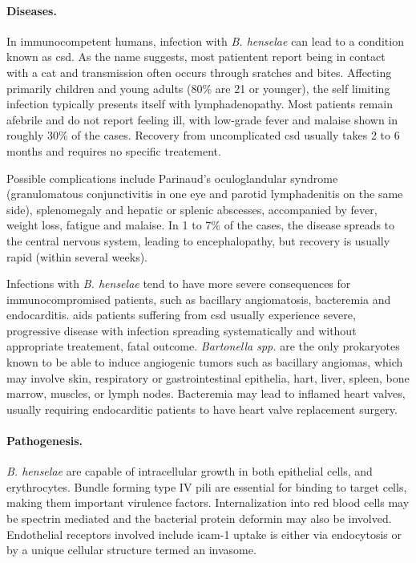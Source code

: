 
\paragraph{Diseases.}
In immunocompetent humans, infection with \textit{B. henselae} can lead to a condition known as \gls{csd}. As the name suggests, most patientent report being in contact with a cat and transmission often occurs through sratches and bites. Affecting primarily children and young adults (80\% are 21 or younger), the self limiting infection typically presents itself with lymphadenopathy. Most patients remain afebrile and do not report feeling ill, with low-grade fever and malaise shown in roughly 30\% of the cases. Recovery from uncomplicated \gls{csd} usually takes 2 to 6 months and requires no specific treatement.

Possible complications include Parinaud's oculoglandular syndrome (granulomatous conjunctivitis in one eye and parotid lymphadenitis on the same side), splenomegaly and hepatic or splenic abscesses, accompanied by fever, weight loss, fatigue and malaise. In 1 to 7\% of the cases, the disease spreads to the central nervous system, leading to encephalopathy, but recovery is usually rapid (within several weeks).


Infections with \textit{B. henselae} tend to have more severe consequences for immunocompromised patients, such as bacillary angiomatosis, bacteremia and endocarditis. \Gls{aids} patients suffering from \gls{csd} usually experience severe, progressive disease with infection spreading systematically and without appropriate treatement, fatal outcome. \textit{Bartonella spp.} are the only prokaryotes known to be able to induce angiogenic tumors such as bacillary angiomas, which may involve skin, respiratory or gastrointestinal epithelia, hart, liver, spleen, bone marrow, muscles, or lymph nodes. Bacteremia may lead to inflamed heart valves, usually requiring endocarditic patients to have heart valve replacement surgery.


\paragraph{Pathogenesis.}
\textit{B. henselae} are capable of intracellular growth in both epithelial cells, and erythrocytes. Bundle forming type IV pili are essential for binding to target cells, making them important virulence factors. Internalization into red blood cells may be spectrin mediated and the bacterial protein deformin may also be involved. Endothelial receptors involved include \gls{icam-1} uptake is either via endocytosis or by a unique cellular structure termed an invasome.

